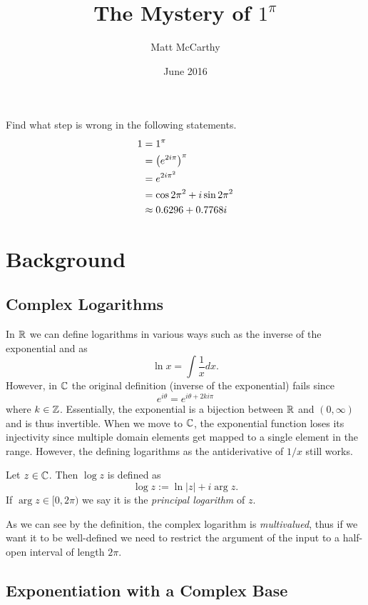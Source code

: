 \documentclass[notitlepage]{problem-solving}
\title{The Mystery of $1^\pi$}
\author{Matt McCarthy}
\date{June 2016}
\begin{document}
\maketitle

\begin{problem*}
	Find what step is wrong in the following statements.
	\begin{align*}
		1 &= 1^\pi\\
		&= \left( e^{2i\pi} \right)^\pi\\
		&=e^{2i\pi^2}\\
		&=\cos 2\pi^2 + i\sin 2\pi^2\\
		&\approx 0.6296 +0.7768 i
	\end{align*}
\end{problem*}

\section{Background}

\subsection{Complex Logarithms}

In $\mathbb{R}$ we can define logarithms in various ways such as the inverse of the exponential and as
\[
	\ln x = \int \frac{1}{x} dx.
\]
However, in $\mathbb{C}$ the original definition (inverse of the exponential) fails since
\[
	e^{i\theta} = e^{i\theta + 2ki\pi}
\]
where $k\in\mathbb{Z}$.
Essentially, the exponential is a bijection between $\mathbb{R}$ and $(0,\infty)$ and is thus invertible.
When we move to $\mathbb{C}$, the exponential function loses its injectivity since multiple domain elements get mapped to a single element in the range.
However, the defining logarithms as the antiderivative of $1/x$ still works.
\begin{definition}
	Let $z\in\mathbb{C}$.
	Then $\log z$ is defined as
	\[
		\log z := \ln |z| +i\arg z.
	\]
	If $\arg z\in[0,2\pi)$ we say it is the \textit{principal logarithm} of $z$.
\end{definition}
As we can see by the definition, the complex logarithm is \textit{multivalued}, thus if we want it to be well-defined we need to restrict the argument of the input to a half-open interval of length $2\pi$.

\subsection{Exponentiation with a Complex Base}
\end{document}
